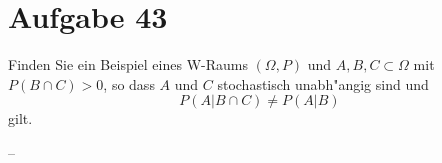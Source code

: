 \section{Aufgabe 43}
\setcounter{section}{43}

Finden Sie ein Beispiel eines W-Raums $(\Omega, P)$ und $A, B, C \subset
\Omega$ mit $P(B \cap C) > 0$, so dass $A$ und $C$ stochastisch unabh"angig
sind und $$P(A|B \cap C) \neq P(A|B)$$ gilt.

--
